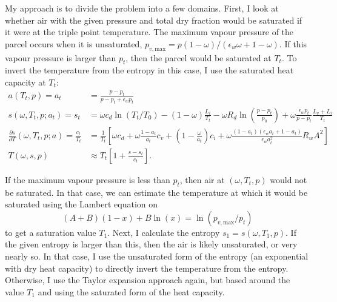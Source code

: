 \documentclass{article}
\newcommand{\epsw}{\epsilon_w}
\begin{document}
My approach is to divide the problem into a few domains. First, I look at whether air with the given pressure and total dry fraction would be saturated if it were at the triple point temperature. The maximum vapour pressure of the parcel occurs when it is unsaturated, $p_{v,\text{max}} = p (1-\omega)/(\epsw \omega + 1-\omega)$. If this vapour pressure is larger than $p_t$, then the parcel would be saturated at $T_t$. To invert the temperature from the entropy in this case, I use the saturated heat capacity at $T_t$:
\begin{align*}
    a(T_t,p) = a_t &= \frac{p-p_t}{p-p_t + \epsw p_t} \\
    s(\omega,T_t,p;a_t) = s_t &= \omega c_d \ln(T_t/T_0) - (1-\omega) \frac{L_i}{T_t} - \omega R_d \ln\left( \frac{p-p_t}{p_0} \right) + \omega \frac{\epsw p_t}{p - p_t} \frac{L_v+L_i}{T_t} \\
    \frac{\partial s}{\partial T}(\omega,T_t,p;a) = \frac{c_t}{T_t} &= \frac{1}{T_t} \left[ \omega c_d + \omega \frac{1-a_t}{a_t} c_v + \left( 1 - \frac{\omega}{a_t} \right) c_i + \omega \frac{(1-a_t) (\epsw a_t + 1-a_t)}{\epsw a_t^2} R_w A^2 \right] \\
    T(\omega,s,p) &\approx T_t \left[ 1 + \frac{s-s_t}{c_t} \right].
\end{align*}

If the maximum vapour pressure is less than $p_t$, then air at $(\omega,T_t,p)$ would not be saturated. In that case, we can estimate the temperature at which it would be saturated using the Lambert equation on
\begin{equation*}
    (A+B) (1-x) + B \ln(x) = \ln(p_{v,\text{max}}/p_t)
\end{equation*}
to get a saturation value $T_1$. Next, I calculate the entropy $s_1 = s(\omega,T_1,p)$. If the given entropy is larger than this, then the air is likely unsaturated, or very nearly so. In that case, I use the unsaturated form of the entropy (an exponential with dry heat capacity) to directly invert the temperature from the entropy. Otherwise, I use the Taylor expansion approach again, but based around the value $T_1$ and using the saturated form of the heat capacity. 
\end{document}
